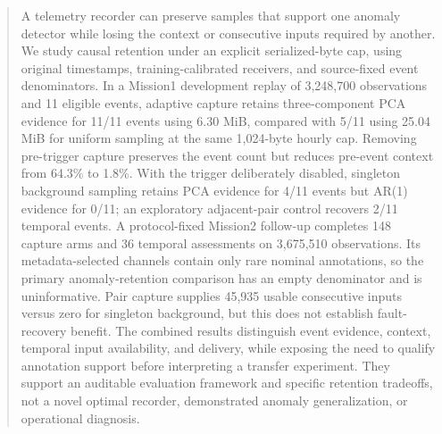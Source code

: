 \begin{abstract}
A telemetry recorder can preserve samples that support one anomaly detector while
losing the context or consecutive inputs required by another. We study causal
retention under an explicit serialized-byte cap, using original timestamps,
training-calibrated receivers, and source-fixed event denominators. In a Mission1
development replay of 3,248,700 observations and 11 eligible events, adaptive
capture retains three-component PCA evidence for 11/11 events using 6.30 MiB,
compared with 5/11 using 25.04 MiB for uniform sampling at the same 1,024-byte
hourly cap. Removing pre-trigger capture preserves the event count but reduces
pre-event context from 64.3\% to 1.8\%. With the trigger deliberately disabled,
singleton background sampling retains PCA evidence for 4/11 events but AR(1)
evidence for 0/11; an exploratory adjacent-pair control recovers 2/11 temporal
events. A protocol-fixed Mission2 follow-up completes 148 capture arms and 36
temporal assessments on 3,675,510 observations. Its metadata-selected channels
contain only rare nominal annotations, so the primary anomaly-retention comparison
has an empty denominator and is uninformative. Pair capture supplies 45,935 usable
consecutive inputs versus zero for singleton background, but this does not establish
fault-recovery benefit. The combined results distinguish event evidence, context,
temporal input availability, and delivery, while exposing the need to qualify
annotation support before interpreting a transfer experiment. They support an
auditable evaluation framework and specific retention tradeoffs, not a novel
optimal recorder, demonstrated anomaly generalization, or operational diagnosis.
\end{abstract}
